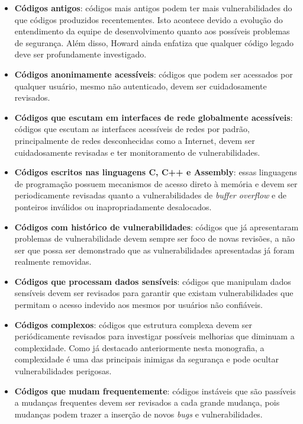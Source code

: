 %

\begin{itemize}
\item \textbf{Códigos antigos}: códigos mais antigos podem ter mais vulnerabilidades do que códigos produzidos recentementes. Isto acontece devido a evolução do entendimento da equipe de desenvolvimento quanto aos possíveis problemas de segurança. Além disso, Howard ainda enfatiza que qualquer código legado deve ser profundamente investigado.
\item \textbf{Códigos anonimamente acessíveis}: códigos que podem ser acessados por qualquer usuário, mesmo não autenticado, devem ser cuidadosamente revisados.
\item \textbf{Códigos que escutam em interfaces de rede globalmente acessíveis}: códigos que escutam as interfaces acessíveis de redes por padrão, principalmente de redes desconhecidas como a Internet, devem ser cuidadosamente revisadas e ter monitoramento de vulnerabilidades.
\item \textbf{Códigos escritos nas linguagens C, C++ e Assembly}: essas linguagens de programação possuem mecanismos de acesso direto à memória e devem ser periodicamente revisadas quanto a vulnerabilidades de \emph{buffer overflow} e de ponteiros inválidos ou inapropriadamente desalocados.
\item \textbf{Códigos com histórico de vulnerabilidades}: códigos que já apresentaram problemas de vulnerabilidade devem sempre ser foco de novas revisões, a não ser que possa ser demonstrado que as vulnerabilidades apresentadas já foram realmente removidas.
\item \textbf{Códigos que processam dados sensíveis}: códigos que manipulam dados sensíveis devem ser revisados para garantir que existam vulnerabilidades que permitam o acesso indevido aos mesmos por usuários não confiáveis.
\item \textbf{Códigos complexos}: códigos que estrutura complexa devem ser periódicamente revisados para investigar possíveis melhorias que diminuam a complexidade. Como já destacado anteriormente nesta monografia, a complexidade é uma das principais inimigas da segurança e pode ocultar vulnerabilidades perigosas.
\item \textbf{Códigos que mudam frequentemente}: códigos instáveis que são passíveis a mudanças frequentes devem ser revisados a cada grande mudança, pois mudanças podem trazer a inserção de novos \emph{bugs} e vulnerabilidades.
\end{itemize}


